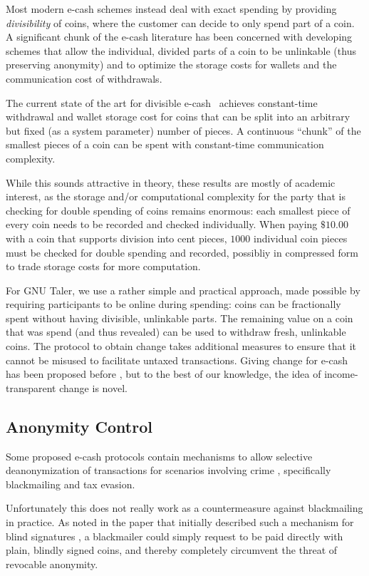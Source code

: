 Most modern e-cash schemes instead deal with exact spending  by providing
\emph{divisibility} of coins, where the customer can decide to only spend part
of a coin.  A significant chunk of the e-cash literature has been concerned
with developing schemes that allow the individual, divided parts of a coin to
be unlinkable (thus preserving anonymity) and to optimize the storage costs for
wallets and the communication cost of withdrawals.

The current state of the art for divisible e-cash~\cite{pointcheval2017cut}
achieves constant-time withdrawal and wallet storage cost for coins that can be
split into an arbitrary but fixed (as a system parameter) number of pieces.  A
continuous ``chunk'' of the smallest pieces of a coin can be spent with
constant-time communication complexity.

While this sounds attractive in theory, these results are mostly of academic
interest, as the storage and/or computational complexity for the party that is
checking for double spending of coins remains enormous:  each smallest piece of
every coin needs to be recorded and checked individually.  When paying
$\$10.00$ with a coin that supports division into cent pieces, $1000$
individual coin pieces must be checked for double spending and recorded,
possibliy in compressed form to trade storage costs for more computation.

For GNU Taler, we use a rather simple and practical approach, made possible by
requiring participants to be online during spending:  coins can be fractionally
spent without having divisible, unlinkable parts. The remaining value on a coin
that was spend (and thus revealed) can be used to withdraw fresh, unlinkable
coins.  The protocol to obtain change takes additional measures to ensure that
it cannot be misused to facilitate untaxed transactions.  Giving change for
e-cash has been proposed before \cite{brickell1995trustee,tracz2001fair}, but
to the best of our knowledge, the idea of income-transparent change is novel.

\subsection{Anonymity Control}

Some proposed e-cash protocols contain mechanisms to allow selective
deanonymization of transactions for scenarios involving crime
\cite{sander1999escrow}, specifically blackmailing and tax evasion.

Unfortunately this does not really work as a countermeasure against
blackmailing in practice.  As noted in the paper that initially described such
a mechanism for blind signatures \cite{stadler1995fair}, a blackmailer could
simply request to be paid directly with plain, blindly signed coins, and
thereby completely circumvent the threat of revocable anonymity.

